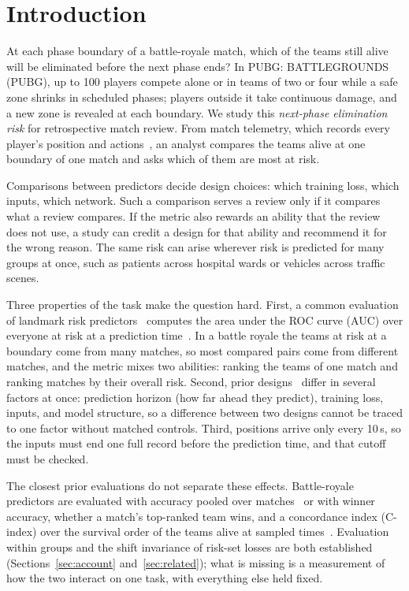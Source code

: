 \documentclass[sigconf,anonymous]{acmart}
\begin{document}
\section{Introduction}
\label{sec:introduction}
At each phase boundary of a battle-royale match, which of the teams still alive will be eliminated before the next phase ends? In PUBG: BATTLEGROUNDS (PUBG), up to 100 players compete alone or in teams of two or four while a safe zone shrinks in scheduled phases; players outside it take continuous damage, and a new zone is revealed at each boundary. We study this \emph{next-phase elimination risk} for retrospective match review. From match telemetry, which records every player's position and actions~\cite{PUBGAPI}, an analyst compares the teams alive at one boundary of one match and asks which of them are most at risk.

Comparisons between predictors decide design choices: which training loss, which inputs, which network. Such a comparison serves a review only if it compares what a review compares. If the metric also rewards an ability that the review does not use, a study can credit a design for that ability and recommend it for the wrong reason. The same risk can arise wherever risk is predicted for many groups at once, such as patients across hospital wards or vehicles across traffic scenes.

Three properties of the task make the question hard. First, a common evaluation of landmark risk predictors~\cite{vanHouwelingen07} computes the area under the ROC curve (AUC) over everyone at risk at a prediction time~\cite{HeagertyZheng05}. In a battle royale the teams at risk at a boundary come from many matches, so most compared pairs come from different matches, and the metric mixes two abilities: ranking the teams of one match and ranking matches by their overall risk. Second, prior designs~\cite{Sagong25a,KRAFTON} differ in several factors at once: prediction horizon (how far ahead they predict), training loss, inputs, and model structure, so a difference between two designs cannot be traced to one factor without matched controls. Third, positions arrive only every 10\,s, so the inputs must end one full record before the prediction time, and that cutoff must be checked.

The closest prior evaluations do not separate these effects. Battle-royale predictors are evaluated with accuracy pooled over matches~\cite{Sagong25a} or with winner accuracy, whether a match's top-ranked team wins, and a concordance index (C-index) over the survival order of the teams alive at sampled times~\cite{KRAFTON}. Evaluation within groups and the shift invariance of risk-set losses are both established (Sections~\ref{sec:account} and~\ref{sec:related}); what is missing is a measurement of how the two interact on one task, with everything else held fixed.
\end{document}
